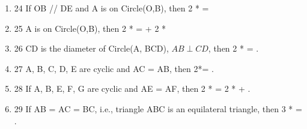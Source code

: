 \documentclass[a4paper,11pt]{article}
\begin{document}
\begin{enumerate}
\item  24
 If OB // DE and A is on Circle(O,B), then 2 * \angle[AB, DE] = \angle[OA,OB]

\item  25
 A is on Circle(O,B), then 2 * \angle[AB, DE] = \angle[OA,OB] + 2 * \angle[OA,DE]

\item  26
 CD is the diameter of Circle(A, BCD), $AB \perp CD$, then  2 * \angle[DB,BA]  = \angle[0].

\item  27
 A, B, C, D, E are cyclic and AC = AB, then 2*\angle[AB, BC] =  \angle[CE, ED].

\item  28
 If A, B, E, F, G are cyclic and AE = AF, then 2 * \angle[AB, CD] =  2 * \angle[BE, CD] +  \angle[EG, GF].

\item  29
 If AB = AC = BC, i.e., triangle ABC is an equilateral triangle, then 3 * \angle[AB, BC] = \angle[0].  
\end{enumerate}
\end{document}
